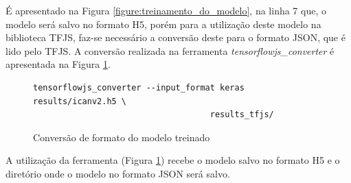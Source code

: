 \par É apresentado na Figura \ref{figure:treinamento_do_modelo}, na linha 7 que, o modelo será salvo no formato H5, porém para a utilização deste modelo na biblioteca TFJS, faz-se necessário a conversão deste para o formato JSON, que é lido pelo TFJS. A conversão realizada na ferramenta \textit{tensorflowjs\_converter} é apresentada na Figura \ref{figure:conversao_do_modelo}.

\begin{figure}[H]
    \centering
    \caption{Conversão de formato do modelo treinado}
    \begin{lstlisting}[language=Shell]
tensorflowjs_converter --input_format keras results/icanv2.h5 \
                                    results_tfjs/
    \end{lstlisting}
    \label{figure:conversao_do_modelo}
\end{figure}

\par A utilização da ferramenta (Figura \ref{figure:conversao_do_modelo}) recebe o modelo salvo no formato H5 e o diretório onde o modelo no formato JSON será salvo.








